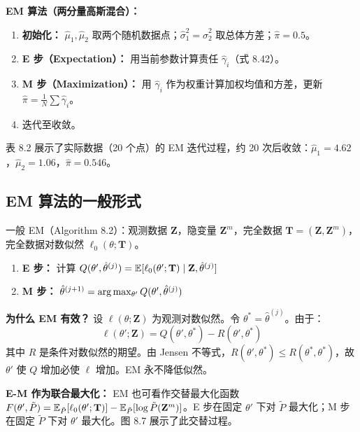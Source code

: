 \textbf{EM 算法（两分量高斯混合）：}
\begin{enumerate}
    \item \textbf{初始化：} $\hat{\mu}_1, \hat{\mu}_2$ 取两个随机数据点；$\hat{\sigma}_1^2=\hat{\sigma}_2^2$ 取总体方差；$\hat{\pi}=0.5$。
    \item \textbf{E 步（Expectation）：} 用当前参数计算责任 $\hat{\gamma}_i$（式 8.42）。
    \item \textbf{M 步（Maximization）：} 用 $\hat{\gamma}_i$ 作为权重计算加权均值和方差，更新 $\hat{\pi} = \frac{1}{N}\sum\hat{\gamma}_i$。
    \item 迭代至收敛。
\end{enumerate}

表 8.2 展示了实际数据（20 个点）的 EM 迭代过程，约 20 次后收敛：$\hat{\mu}_1=4.62$，$\hat{\mu}_2=1.06$，$\hat{\pi}=0.546$。

\subsection{EM 算法的一般形式}

一般 EM（Algorithm 8.2）：观测数据 $\mathbf{Z}$，隐变量 $\mathbf{Z}^m$，完全数据 $\mathbf{T}=(\mathbf{Z}, \mathbf{Z}^m)$，完全数据对数似然 $\ell_0(\theta; \mathbf{T})$。

\begin{enumerate}
    \item \textbf{E 步：} 计算 $Q(\theta', \hat{\theta}^{(j)}) = \mathbb{E}[\ell_0(\theta'; \mathbf{T}) \mid \mathbf{Z}, \hat{\theta}^{(j)}]$
    \item \textbf{M 步：} $\hat{\theta}^{(j+1)} = \arg\max_{\theta'} Q(\theta', \hat{\theta}^{(j)})$
\end{enumerate}

\textbf{为什么 EM 有效？} 设 $\ell(\theta; \mathbf{Z})$ 为观测对数似然。令 $\theta^* = \hat{\theta}^{(j)}$。由于：
\begin{equation}
    \ell(\theta'; \mathbf{Z}) = Q(\theta', \theta^*) - R(\theta', \theta^*)
\end{equation}
其中 $R$ 是条件对数似然的期望。由 Jensen 不等式，$R(\theta', \theta^*) \leq R(\theta^*, \theta^*)$，故 $\theta'$ 使 $Q$ 增加必使 $\ell$ 增加。EM 永不降低似然。

\textbf{E-M 作为联合最大化：} EM 也可看作交替最大化函数 $F(\theta', \tilde{P}) = \mathbb{E}_{\tilde{P}}[\ell_0(\theta'; \mathbf{T})] - \mathbb{E}_{\tilde{P}}[\log\tilde{P}(\mathbf{Z}^m)]$。E 步在固定 $\theta'$ 下对 $\tilde{P}$ 最大化；M 步在固定 $\tilde{P}$ 下对 $\theta'$ 最大化。图 8.7 展示了此交替过程。

